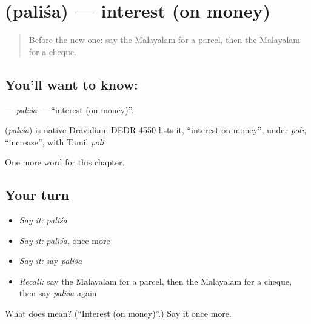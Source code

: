 \section[\texorpdfstring{\ml{പലിശ} (paliśa)}{പലിശ (paliśa)}]{ (paliśa) — interest (on money)}

\label{lesson:ML-C288-palisa}



\begin{quote}
Before the new one: say the Malayalam for a parcel, then the Malayalam for a cheque.
\end{quote}

\subsection*{You'll want to know: }
\textbf{} — \emph{paliśa} — \textquotedblleft{}interest (on money)\textquotedblright{}.

\begin{cousinweb}
\textbf{} (\emph{paliśa}) is native Dravidian: DEDR 4550 lists it, \textquotedblleft{}interest on money\textquotedblright{}, under \emph{poli}, \textquotedblleft{}increase\textquotedblright{}, with Tamil \emph{poli}.
\end{cousinweb}

\begin{grammarlens}[title={What you've built}]
One more word for this chapter.
\end{grammarlens}

\subsection*{Your turn}
\begin{itemize}
\raggedright
  \item \emph{Say it:} \emph{paliśa}
  \item \emph{Say it:} \emph{paliśa}, once more
  \item \emph{Say it:} say \emph{paliśa}
  \item \emph{Recall:} say the Malayalam for a parcel, then the Malayalam for a cheque, then say \emph{paliśa} again
\end{itemize}

\begin{tcolorbox}[breakable,colback=teal!4,colframe=teal!35!black,title={Before you move on}]
What does  mean? (\textquotedblleft{}Interest (on money)\textquotedblright{}.) Say it once more.
\end{tcolorbox}

